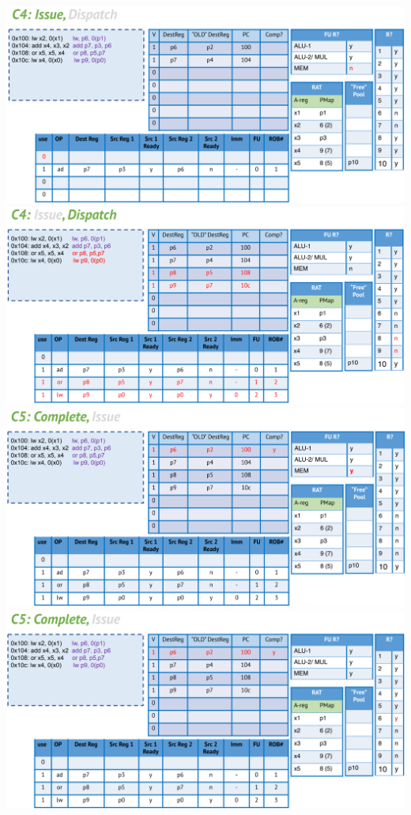 \documentclass[10pt]{article}
\begin{document}
\begin{center}
\includegraphics*[width=\textwidth]{W5_out_of_order/8.png}\\
\includegraphics*[width=\textwidth]{W5_out_of_order/9.png}\\
\includegraphics*[width=\textwidth]{W5_out_of_order/10.png}\\
\includegraphics*[width=\textwidth]{W5_out_of_order/11.png}\\

\end{center}
\end{document}
